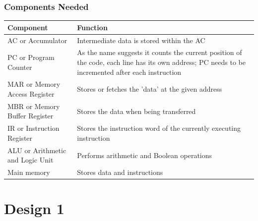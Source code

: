 \documentclass[12pt]{article}
\begin{document}
\subsubsection{Components Needed}
\begin{center}
    \begin{tabular}{|p{5cm}|p{10cm}|}
        \hline
        \textbf{Component}               & \textbf{Function}                                                                                                                                 \\
        \hline
        AC or Accumulator                & Intermediate data is stored within the AC                                                                                                         \\
        \hline
        PC or Program Counter            & As the name suggests it counts the current position of the code, each line has its own address; PC needs to be incremented after each instruction \\
        \hline
        MAR or Memory Access Register    & Stores or fetches the ’data’ at the given address                                                                                                 \\
        \hline
        MBR or Memory Buffer Register    & Stores the data when being transferred                                                                                                            \\
        \hline
        IR or Instruction Register       & Stores the instruction word of the currently executing instruction                                                                                \\
        \hline
        ALU or Arithmetic and Logic Unit & Performs arithmetic and Boolean operations                                                                                                        \\
        \hline
        Main memory                      & Stores data and instructions                                                                                                                      \\
        \hline
    \end{tabular}
\end{center}

\newpage
\section{Design 1}\
\end{document}
